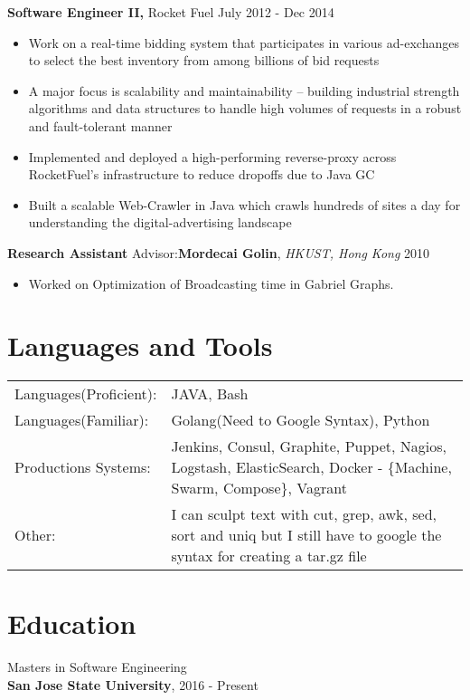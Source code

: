 \documentclass[margin]{res}
\begin{document}
\begin{resume}
 {\bf Software Engineer II,} Rocket Fuel \hfill July 2012 - Dec 2014
 \begin{itemize} \itemsep -2pt  %
 \item Work on a real-time bidding system that participates in various ad-exchanges to select the best inventory from among billions of bid requests
 \item A major focus is scalability and maintainability -- building industrial strength algorithms and data structures to handle high volumes of requests in a robust and fault-tolerant manner
 \item Implemented and deployed a high-performing reverse-proxy across RocketFuel's infrastructure to reduce dropoffs due to Java GC
 \item Built a scalable Web-Crawler in Java which crawls hundreds of sites a day for understanding the digital-advertising landscape
 \end{itemize}

 {\bf Research Assistant} Advisor:\textbf{Mordecai Golin}, \textit{HKUST, Hong Kong} \hfill 2010
 \begin{itemize} \itemsep -2pt  %
 \item Worked  on  Optimization  of  Broadcasting  time  in  Gabriel  Graphs.
 \end{itemize}
 
\section{Languages and Tools}
   \begin{tabular}{l p{3in}}
    {Languages(Proficient):} & JAVA, Bash \\
    {Languages(Familiar):} &  Golang(Need to Google Syntax), Python  \\
    {Productions Systems:} &  Jenkins, Consul, Graphite, Puppet, Nagios, Logstash, ElasticSearch, Docker - \{Machine, Swarm, Compose\}, Vagrant \\
    {Other:} & I can sculpt text with cut, grep, awk, sed, sort and uniq but I still have to google the syntax for creating a tar.gz file \\
     \end{tabular}

\section{Education}
  Masters in Software Engineering \\
  {\bf San Jose State University}, 2016 - Present \\
  

\end{resume}
\end{document}
